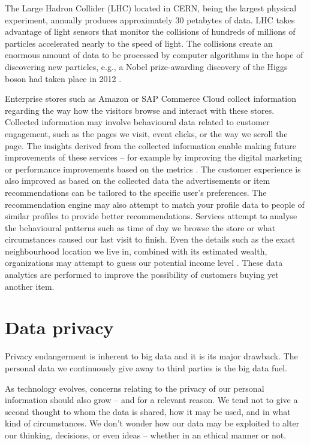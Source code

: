 \documentclass[a4paper,twoside,12pt]{book}
\begin{document}
The Large Hadron Collider (LHC) located in CERN, being the largest physical experiment, annually produces approximately 30 petabytes of data. LHC takes advantage of light sensors that monitor the collisions of hundreds of millions of particles accelerated nearly to the speed of light. The collisions create an enormous amount of data to be processed by computer algorithms in the hope of discovering new particles, e.g., a Nobel prize-awarding discovery of the Higgs boson had taken place in 2012 \cite{bib:cern}.

Enterprise stores such as Amazon or SAP Commerce Cloud collect information regarding the way how the visitors browse and interact with these stores. Collected information may involve behavioural data related to customer engagement, such as the pages we visit, event clicks, or the way we scroll the page. The insights derived from the collected information enable making future improvements of these services – for example by improving the digital marketing or performance improvements based on the metrics \cite{bib:sap}. The customer experience is also improved as based on the collected data the advertisements or item recommendations can be tailored to the specific user's preferences. The recommendation engine may also attempt to match your profile data to people of similar profiles to provide better recommendations. Services attempt to analyse the behavioural patterns such as time of day we browse the store or what circumstances caused our last visit to finish. Even the details such as the exact neighbourhood location we live in, combined with its estimated wealth, organizations may attempt to guess our potential income level \cite{bib:big_data_in_practice}. These data analytics are performed to improve the possibility of customers buying yet another item.

\section{Data privacy}

Privacy endangerment is inherent to big data and it is its major drawback. The personal data we continuously give away to third parties is the big data fuel.

As technology evolves, concerns relating to the privacy of our personal information should also grow – and for a relevant reason.  We tend not to give a second thought to whom the data is shared, how it may be used, and in what kind of circumstances. We don't wonder how our data may be exploited to alter our thinking, decisions, or even ideas – whether in an ethical manner or not. 
\end{document}
